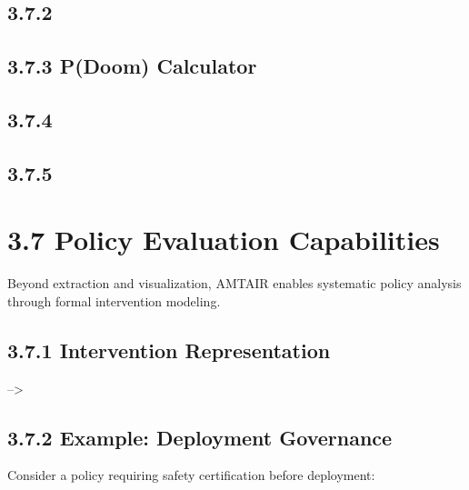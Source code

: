\documentclass[
  11pt,
  letterpaper,
]{book}
\begin{document}
\subsection*{3.7.2}\label{section}

\subsection*{3.7.3 P(Doom) Calculator}\label{pdoom-calculator}

\subsection*{3.7.4}\label{section-1}

\subsection*{3.7.5}\label{section-2}

\section*{3.7 Policy Evaluation
Capabilities}\label{sec-policy-evaluation}


Beyond extraction and visualization, AMTAIR enables systematic policy
analysis through formal intervention modeling.

\subsection*{3.7.1 Intervention
Representation}\label{sec-intervention-representation}

--\textgreater{}

\subsection*{3.7.2 Example: Deployment
Governance}\label{sec-deployment-example}

Consider a policy requiring safety certification before deployment:
\end{document}
